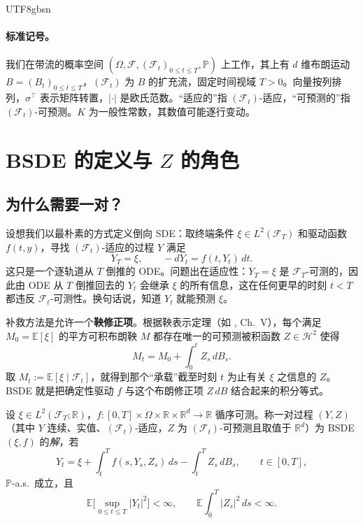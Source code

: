 \documentclass{article}
\theoremstyle{plain}
\theoremstyle{definition}
\theoremstyle{remark}
\newcommand{\E}{\mathbb{E}}
\newcommand{\Prob}{\mathbb{P}}
\newcommand{\R}{\mathbb{R}}
\newcommand{\F}{\mathcal{F}}
\newcommand{\Hc}{\mathcal{H}}
\begin{document}
\begin{CJK*}{UTF8}{gbsn}
\paragraph{标准记号。} 我们在带流的概率空间 $(\Omega, \F, (\F_t)_{0 \le t \le T}, \Prob)$ 上工作，其上有 $d$ 维布朗运动 $B = (B_t)_{0 \le t \le T}$，$(\F_t)$ 为 $B$ 的扩充流，固定时间视域 $T > 0$。向量按列排列，$\sigma^{\top}$ 表示矩阵转置，$|\cdot|$ 是欧氏范数。“适应的”指 $(\F_t)$-适应，“可预测的”指 $(\F_t)$-可预测。$K$ 为一般性常数，其数值可能逐行变动。

\section{BSDE 的定义与 \texorpdfstring{$Z$}{Z} 的角色}

\subsection{为什么需要一对？}

设想我们以最朴素的方式定义倒向 SDE：取终端条件 $\xi \in L^2(\F_T)$ 和驱动函数 $f(t, y)$，寻找 $(\F_t)$-适应的过程 $Y$ 满足
\[
  Y_T = \xi, \qquad -dY_t = f(t, Y_t)\,dt.
\]
这只是一个逐轨道从 $T$ 倒推的 ODE。问题出在适应性：$Y_T = \xi$ 是 $\F_T$-可测的，因此由 ODE 从 $T$ 倒推回去的 $Y_t$ 会继承 $\xi$ 的所有信息，这在任何更早的时刻 $t < T$ 都违反 $\F_t$-可测性。换句话说，知道 $Y_t$ 就能预测 $\xi$。

补救方法是允许一个\textbf{鞅修正项}。根据鞅表示定理（如 \cite{revuz-yor}, Ch.~V），每个满足 $M_0 = \E[\xi]$ 的平方可积布朗鞅 $M$ 都存在唯一的可预测被积函数 $Z \in \Hc^2$ 使得
\[
  M_t = M_0 + \int_0^t Z_s\, dB_s.
\]
取 $M_t := \E[\xi \mid \F_t]$，就得到那个“承载”截至时刻 $t$ 为止有关 $\xi$ 之信息的 $Z$。BSDE 就是把确定性驱动 $f$ 与这个布朗修正项 $Z\, dB$ 结合起来的积分等式。

\begin{definition}[BSDE 的解]\label{def:bsde}
设 $\xi \in L^2(\F_T; \R)$，$f : [0,T] \times \Omega \times \R \times \R^d \to \R$ 循序可测。称一对过程 $(Y, Z)$（其中 $Y$ 连续、实值、$(\F_t)$-适应，$Z$ 为 $(\F_t)$-可预测且取值于 $\R^d$）为 BSDE $(\xi, f)$ 的\emph{解}，若
\begin{equation}\label{eq:bsde}
  Y_t = \xi + \int_t^T f(s, Y_s, Z_s)\,ds - \int_t^T Z_s\, dB_s, \qquad t \in [0, T],
\end{equation}
$\Prob$-a.s.\ 成立，且
\[
  \E\!\Big[\sup_{0 \le t \le T}|Y_t|^2\Big] < \infty, \qquad \E\!\int_0^T |Z_s|^2\,ds < \infty.
\]
\end{definition}


\end{CJK*}
\end{document}
